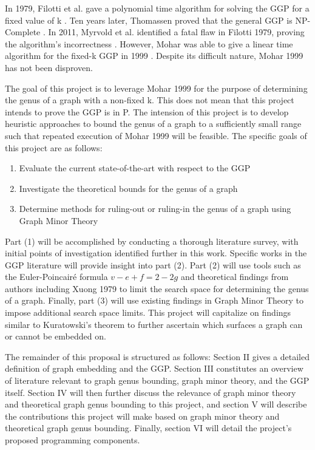 \documentclass[12pt,conference]{IEEEtran}
\begin{document}
In 1979, Filotti et al. gave a polynomial time algorithm for solving the GGP for a fixed value of k \cite{filotti}. Ten years later, Thomassen proved that the general GGP is NP-Complete \cite{thomassen}. In 2011, Myrvold et al. identified a fatal flaw in Filotti 1979, proving the algorithm's incorrectness \cite{myrvold-kocay}. However, Mohar was able to give a linear time algorithm for the fixed-k GGP in 1999 \cite{mohar}. Despite its difficult nature, Mohar 1999 has not been disproven. 

The goal of this project is to leverage Mohar 1999 for the purpose of determining the genus of a graph with a non-fixed k. This does not mean that this project intends to prove the GGP is in P. The intension of this project is to develop heuristic approaches to bound the genus of a graph to a sufficiently small range such that repeated execution of Mohar 1999 will be feasible. The specific goals of this project are as follows:

\begin{enumerate}
\item Evaluate the current state-of-the-art with respect to the GGP
\item Investigate the theoretical bounds for the genus of a graph
\item Determine methods for ruling-out or ruling-in the genus of a graph using Graph Minor Theory
\end{enumerate}

Part (1) will be accomplished by conducting a thorough literature survey, with initial points of investigation identified further in this work. Specific works in the GGP literature will provide insight into part (2). Part (2) will use tools such as the Euler-Poincair\'e formula $v-e+f=2-2g$ and theoretical findings from authors including Xuong 1979 \cite{xuong} to limit the search space for determining the genus of a graph. Finally, part (3) will use existing findings in Graph Minor Theory to impose additional search space limits. This project will capitalize on findings similar to Kuratowski's theorem to further ascertain which surfaces a graph can or cannot be embedded on.

The remainder of this proposal is structured as follows: Section II gives a detailed definition of graph embedding and the GGP. Section III constitutes an overview of literature relevant to graph genus bounding, graph minor theory, and the GGP itself. Section IV will then further discuss the relevance of graph minor theory and theoretical graph genus bounding to this project, and section V will describe the contributions this project will make based on graph minor theory and theoretical graph genus bounding. Finally, section VI will detail the project's proposed programming components.
\end{document}
